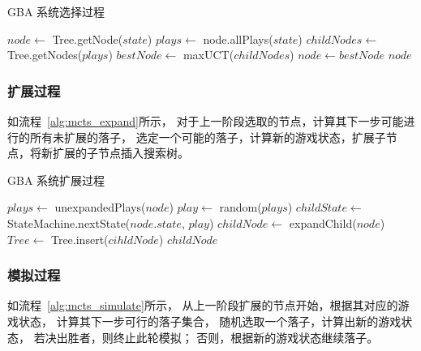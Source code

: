 \documentclass[UTF8,cs4size]{ctexart}
\begin{document}
\begin{algorithm}
	\caption{GBA 系统选择过程}
	\label{alg:mcts_select}
  \begin{algorithmic}[1]
      \State $node \gets$ Tree.getNode($state$)
        \State $plays \gets$ node.allPlays($state$)
        \State $childNodes \gets$ Tree.getNodes($plays$)
        \State $bestNode \gets$ maxUCT($childNodes$)
        \State $node \gets bestNode$
      \EndWhile
      \Return $node$
    \EndFunction
	\end{algorithmic}  
\end{algorithm}

\subsubsection{扩展过程}
如流程~\ref{alg:mcts_expand}所示，
对于上一阶段选取的节点，计算其下一步可能进行的所有未扩展的落子，
选定一个可能的落子，计算新的游戏状态，扩展子节点，将新扩展的子节点插入搜索树。

\begin{algorithm}
	\caption{GBA 系统扩展过程}
	\label{alg:mcts_expand}
  \begin{algorithmic}[1]
      \State $plays \gets$ unexpandedPlays($node$)
      \State $play \gets$ random($plays$)
      \State $childState \gets$ StateMachine.nextState($node.state$, $play$)
      \State $childNode \gets$ expandChild($node$)
      \State $Tree \gets$ Tree.insert($cihldNode$)
      \Return $childNode$
    \EndFunction
	\end{algorithmic}  
\end{algorithm}

\subsubsection{模拟过程}
如流程~\ref{alg:mcts_simulate}所示，
从上一阶段扩展的节点开始，根据其对应的游戏状态，
计算其下一步可行的落子集合，
随机选取一个落子，计算出新的游戏状态，
若决出胜者，则终止此轮模拟；
否则，根据新的游戏状态继续落子。
\end{document}
